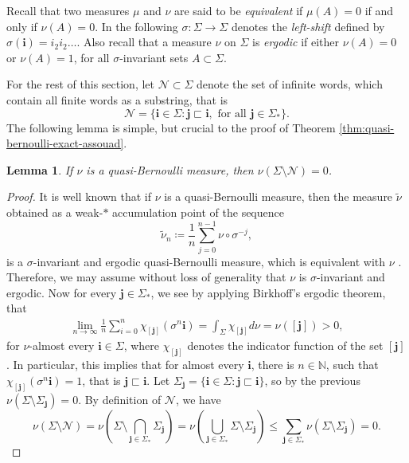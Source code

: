 \documentclass{PRM}
\newcommand{\field}[1]{\mathbb{#1}}
\newcommand{\N}{\field{N}}
\newcommand{\iii}{\mathbf{i}}
\newcommand{\jjj}{\mathbf{j}}
\newcommand{\NN}{\mathcal{N}}
\theoremstyle{plain}
\newtheorem{lemma}[thm]{Lemma}
\theoremstyle{definition}
\theoremstyle{remark}
\begin{document}
Recall that two measures $\mu$ and $\nu$ are said to be \emph{equivalent} if $\mu(A)=0$ if and only if $\nu(A)=0$. In the following $\sigma\colon \Sigma\to\Sigma$ denotes the \emph{left-shift} defined by $\sigma(\iii)=i_2i_2\ldots$. Also recall that a measure $\nu$ on $\Sigma$ is \emph{ergodic} if either $\nu(A)=0$ or $\nu(A)=1$, for all $\sigma$-invariant sets $A\subset \Sigma$.

For the rest of this section, let $\NN\subset \Sigma$ denote the set of infinite words, which contain all finite words as a substring, that is
\begin{equation*}
    \NN = \{\iii\in\Sigma\colon \jjj\sqsubset\iii,\text{ for all }\jjj\in\Sigma_*\}.
\end{equation*}
The following lemma is simple, but crucial to the proof of Theorem \ref{thm:quasi-bernoulli-exact-assouad}.
\begin{lemma}\label{lemma:quasi-normal}
If $\nu$ is a quasi-Bernoulli measure, then $\nu(\Sigma\setminus\NN)=0$.
\end{lemma}
\begin{proof}
It is well known that if $\nu$ is a quasi-Bernoulli measure, then the measure $\tilde{\nu}$ obtained as a weak-$*$ accumulation point of the sequence
\begin{equation*}
    \tilde{\nu}_n\coloneqq\frac{1}{n}\sum_{j=0}^{n-1}\nu\circ\sigma^{-j},
\end{equation*}
is a $\sigma$-invariant and ergodic quasi-Bernoulli measure, which is equivalent with $\nu$ \cite{Heur}. Therefore, we may assume without loss of generality that $\nu$ is $\sigma$-invariant and ergodic. Now for every $\mathbf{j}\in\Sigma_*$, we see by applying Birkhoff's ergodic theorem, that
\begin{align*}
    \lim_{n\to\infty}\frac{1}{n}\sum_{i=0}^{n}\chi_{[\mathbf{j}]}(\sigma^n\mathbf{i})=\int_{\Sigma}\chi_{[\mathbf{j}]}d\nu = \nu([\mathbf{j}])>0,
\end{align*}
for $\nu$-almost every $\mathbf{i}\in\Sigma$, where $\chi_{[\mathbf{j}]}$ denotes the indicator function of the set $[\mathbf{j}]$. In particular, this implies that for almost every $\mathbf{i}$, there is $n\in\N$, such that $\chi_{[\mathbf{j}]}(\sigma^n\mathbf{i})=1$, that is $\mathbf{j}\sqsubset\mathbf{i}$. Let $\Sigma_{\mathbf{j}}=\{\mathbf{i}\in\Sigma\colon \mathbf{j}\sqsubset\mathbf{i}\}$, so by the previous $\nu(\Sigma\setminus\Sigma_{\mathbf{j}})=0$. By definition of $\mathcal{N}$, we have
\begin{equation*}
    \nu(\Sigma\setminus\mathcal{N})=\nu\left(\Sigma\setminus\bigcap_{\mathbf{j}\in\Sigma_*}\Sigma_{\mathbf{j}}\right)=\nu\left(\bigcup_{\mathbf{j}\in\Sigma_*}\Sigma\setminus\Sigma_{\mathbf{j}}\right)\leq \sum_{\mathbf{j}\in\Sigma_*}\nu(\Sigma\setminus\Sigma_{\mathbf{j}})=0.
\end{equation*}
\end{proof}
\end{document}
